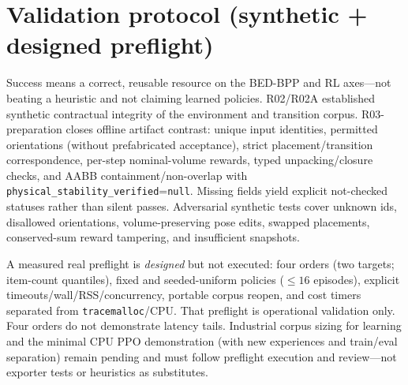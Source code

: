 \section{Validation protocol (synthetic + designed preflight)}

Success means a correct, reusable resource on the BED-BPP and RL axes---not
beating a heuristic and not claiming learned policies. R02/R02A established
synthetic contractual integrity of the environment and transition corpus.
R03-preparation closes offline artifact contrast: unique input identities,
permitted orientations (without prefabricated acceptance), strict
placement/transition correspondence, per-step nominal-volume rewards, typed
unpacking/closure checks, and AABB containment/non-overlap with
\texttt{physical\_stability\_verified}=\texttt{null}. Missing fields yield
explicit not-checked statuses rather than silent passes. Adversarial synthetic
tests cover unknown ids, disallowed orientations, volume-preserving pose edits,
swapped placements, conserved-sum reward tampering, and insufficient snapshots.

A measured real preflight is \emph{designed} but not executed: four orders
(two targets; item-count quantiles), fixed and seeded-uniform policies
($\le 16$ episodes), explicit timeouts/wall/RSS/concurrency, portable corpus
reopen, and cost timers separated from \texttt{tracemalloc}/CPU. That preflight
is operational validation only. Four orders do not demonstrate latency tails.
Industrial corpus sizing for learning and the minimal CPU PPO demonstration
(with new experiences and train/eval separation) remain pending and must follow
preflight execution and review---not exporter tests or heuristics as substitutes.
